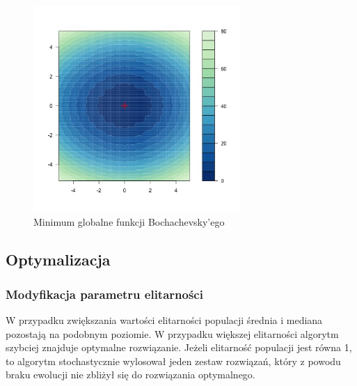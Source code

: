 \documentclass{article}
\begin{document}
     \begin{figure}[!htbp]
    \centering
    \includegraphics[width=0.7\textwidth]{inc/wykresyfunkcji/bohachevsky-global-minimum}
     \caption{Minimum globalne funkcji Bochachevsky'ego}
    \end{figure}
    
    
    \subsection{Optymalizacja}
\subsubsection{Modyfikacja parametru elitarności}    
W przypadku zwiększania wartości elitarności populacji średnia i mediana pozostają na podobnym poziomie. W przypadku większej elitarności algorytm szybciej znajduje optymalne rozwiązanie. Jeżeli elitarność populacji jest równa 1, to algorytm stochastycznie wylosował jeden zestaw rozwiązań, który z powodu braku ewolucji nie zbliżył się do rozwiązania optymalnego.
\end{document}
